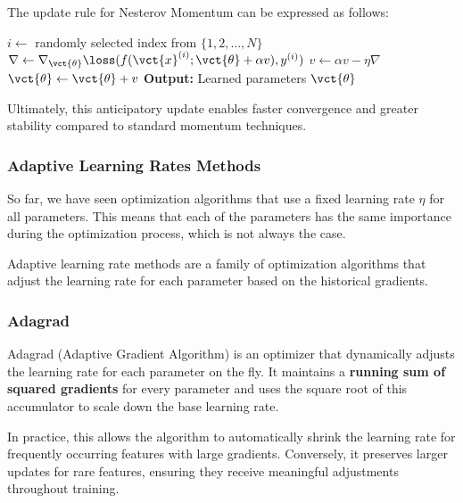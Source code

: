 The update rule for Nesterov Momentum can be expressed as follows:

\begin{algorithm}[H]
    \caption{Stochastic Gradient Descent with Nesterov Momentum}
    \begin{algorithmic}[1]
            \State $i \leftarrow$ randomly selected index from $\{1, 2, \ldots, N\}$
            \State $\nabla \leftarrow \nabla_{\vct{\theta}} \loss(f(\vct{x}^{(i)}; \vct{\theta} + \alpha v), y^{(i)})$
            \State $v \leftarrow \alpha v - \eta \nabla$
            \State $\vct{\theta} \leftarrow \vct{\theta} + v$
        \EndWhile
        \State \textbf{Output:} Learned parameters $\vct{\theta}$
    \end{algorithmic}
\end{algorithm}
Ultimately, this anticipatory update enables faster convergence and greater stability compared to standard momentum techniques.

\subsubsection{Adaptive Learning Rates Methods}
So far, we have seen optimization algorithms that use a fixed learning rate $\eta$ for all parameters. This means that
each of the parameters has the same importance during the optimization process, which is not always the case.

Adaptive learning rate methods are a family of optimization algorithms that adjust the learning rate for each parameter based on the historical gradients.

\subsubsection*{Adagrad} 
Adagrad (Adaptive Gradient Algorithm) is an optimizer that dynamically adjusts the learning rate for each parameter on the fly. 
It maintains a \textbf{running sum of squared gradients} for every parameter and uses the square root of this accumulator to scale down the base learning rate. 

In practice, this allows the algorithm to automatically shrink the learning rate for frequently occurring features with large gradients. 
Conversely, it preserves larger updates for rare features, ensuring they receive meaningful adjustments throughout training. 

